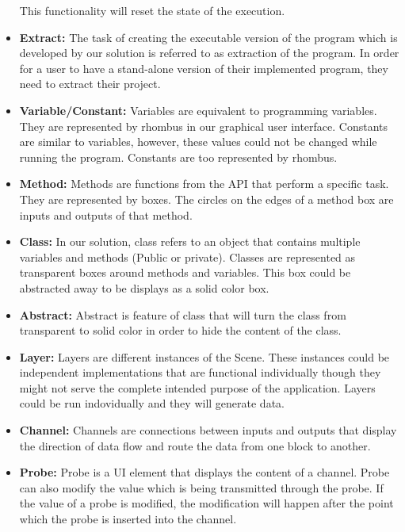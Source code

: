 \documentclass[journal,10pt,onecolumn,compsoc]{IEEEtran} \usepackage[margin=1.0in]{geometry} \usepackage{pdfpages} \usepackage{graphicx}
\begin{document}
\begin{itemize}
		This functionality will reset the state of the execution.\\
	\item \textbf{Extract:}
		The task of creating the executable version of the program which is developed by our solution is referred to as extraction of the program.
		In order for a user to have a stand-alone version of their implemented program, they need to extract their project.\\
	\item \textbf{Variable/Constant:}
		Variables are equivalent to programming variables. They are represented by rhombus in our graphical user interface.
		Constants are similar to  variables, however, these values could not be changed while running the program.
		Constants are too represented by rhombus.\\
	\item \textbf{Method:}
		Methods are functions from the API that perform a specific task. They are represented by boxes.
		The circles on the edges of a method box are inputs and outputs of that method.\\
	\item \textbf{Class:} 
		In our solution, class refers to an object that contains multiple variables and methods (Public or private).
		Classes are represented as transparent boxes around methods and variables. This box could be abstracted away to be displays as a solid color box.\\
	\item \textbf{Abstract:}
		Abstract is feature of class that will turn the class from transparent to solid color in order to hide the content of the class.\\
	\item \textbf{Layer:} 
		Layers are different instances of the Scene. 
		These instances could be independent implementations that are functional individually though they might not serve the complete intended purpose of the application.
		Layers could be run indovidually and they will generate data.\\
	\item \textbf{Channel:}
		 Channels are connections between inputs and outputs that display the direction of data flow and route the data from one block to another.\\
	\item \textbf{Probe:}
		Probe is a UI element that displays the content of a channel.
		Probe can also modify the value which is being transmitted through the probe.
		If the value of a probe is modified, the modification will happen after the point which the probe is inserted into the channel.

\end{itemize}
\end{document}

